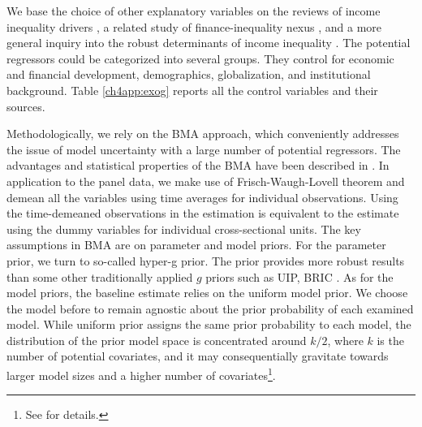\begin{refsection}
We base the choice of other explanatory variables on the reviews of income inequality drivers \parencite{roineetal2009,nolan2019drivers}, a related study of finance-inequality nexus \parencite{de2017finance}, and a more general inquiry into the robust determinants of income inequality \parencite{furceri2019robust}. The potential regressors could be categorized into several groups. They control for economic and financial development, demographics, globalization, and institutional background. Table \ref{ch4app:exog} reports all the control variables and their sources. 

%
%
Methodologically, we rely on the \ac{BMA} approach, which conveniently addresses the issue of model uncertainty with a large number of potential regressors. The advantages and statistical properties of the \ac{BMA} have been described in \textcite{Koop2003}. In application to the panel data, we make use of Frisch-Waugh-Lovell theorem and demean all the variables using time averages for individual observations. Using the time-demeaned observations in the estimation is equivalent to the estimate using the dummy variables for individual cross-sectional units. The key assumptions in \ac{BMA} are on parameter and model priors. For the parameter prior, we turn to so-called hyper-g prior. The prior provides more robust results than some other traditionally applied $g$ priors such as \ac{UIP}, \ac{BRIC} \parencite{feldkircher2012impact}. As for the model priors, the baseline estimate relies on the uniform model prior. We choose the model before to remain agnostic about the prior probability of each examined model. While uniform prior assigns the same prior probability to each model, the distribution of the prior model space is concentrated around $k/2$, where $k$ is the number of potential covariates, and it may consequentially gravitate towards larger model sizes and a higher number of covariates\footnote{See \textcite{LeySteel2009} for details.}.


\end{refsection}
